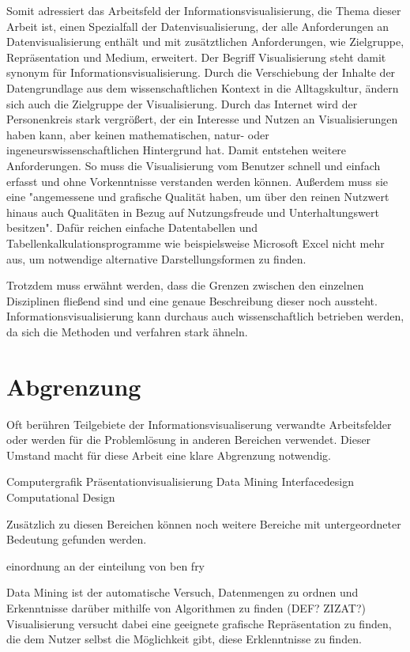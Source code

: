 \documentclass[a4paper, 12pt, DIVcalc, onepage, pdftex, headsepline, footsepline]{scrreprt}
\begin{document}
Somit adressiert das Arbeitsfeld der Informationsvisualisierung, die Thema dieser Arbeit ist,
einen Spezialfall der Datenvisualisierung, der alle Anforderungen an Datenvisualisierung enthält
und mit zusätztlichen Anforderungen, wie Zielgruppe, Repräsentation und Medium, erweitert.
Der Begriff Visualisierung steht damit synonym für Informationsvisualisierung.
Durch die Verschiebung der Inhalte der Datengrundlage aus dem wissenschaftlichen Kontext
in die Alltagskultur, ändern sich auch die Zielgruppe der Visualisierung. Durch das Internet
wird der Personenkreis stark vergrößert, der ein Interesse und Nutzen an Visualisierungen
haben kann, aber keinen mathematischen, natur- oder ingeneurswissenschaftlichen Hintergrund
hat. Damit entstehen weitere Anforderungen. So muss die Visualisierung vom Benutzer
schnell und einfach erfasst und ohne Vorkenntnisse verstanden werden können.
Außerdem muss sie eine "angemessene und grafische Qualität haben, um über den
reinen Nutzwert hinaus auch Qualitäten in Bezug auf Nutzungsfreude und Unterhaltungswert besitzen".\citep[S.\,438]{Preim}
Dafür reichen einfache Datentabellen und Tabellenkalkulationsprogramme wie beispielsweise Microsoft Excel
nicht mehr aus, um notwendige alternative Darstellungsformen zu finden.

Trotzdem muss erwähnt werden, dass die Grenzen zwischen den einzelnen Disziplinen fließend sind
und eine genaue Beschreibung dieser noch aussteht. Informationsvisualisierung kann durchaus
auch wissenschaftlich betrieben werden, da sich die Methoden und verfahren stark ähneln.

\section{Abgrenzung}
\label{sec:Abgrenzung}
Oft berühren Teilgebiete der Informationsvisualiserung verwandte Arbeitsfelder oder werden für die Problemlösung
in anderen Bereichen verwendet. Dieser Umstand macht für diese Arbeit eine klare Abgrenzung notwendig.



Computergrafik
Präsentationvisualisierung
Data Mining
Interfacedesign
Computational Design

Zusätzlich zu diesen Bereichen können noch weitere Bereiche mit untergeordneter Bedeutung gefunden werden.

einordnung an der einteilung von ben fry


Data Mining ist der automatische Versuch, Datenmengen zu ordnen und Erkenntnisse darüber mithilfe von Algorithmen zu finden (DEF? ZIZAT?)
Visualisierung versucht dabei eine geeignete grafische Repräsentation zu finden, die dem Nutzer selbst die Möglichkeit gibt,
diese Erklenntnisse zu finden.
\end{document}
